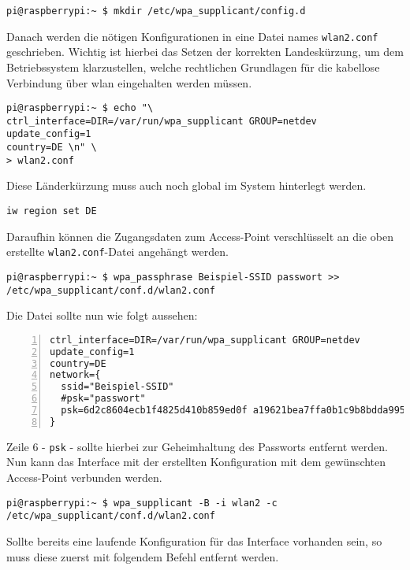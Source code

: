 \begin{lstlisting}
pi@raspberrypi:~ $ mkdir /etc/wpa_supplicant/config.d
\end{lstlisting}

\noindent Danach werden die nötigen Konfigurationen in eine Datei names \texttt{wlan2.conf} geschrieben.
Wichtig ist hierbei das Setzen der korrekten Landeskürzung, um dem Betriebssystem klarzustellen, welche rechtlichen Grundlagen
für die kabellose Verbindung über \gls{wlan} eingehalten werden müssen.

\begin{lstlisting}
pi@raspberrypi:~ $ echo "\
ctrl_interface=DIR=/var/run/wpa_supplicant GROUP=netdev
update_config=1
country=DE \n" \
> wlan2.conf
\end{lstlisting}

\noindent Diese Länderkürzung muss auch noch global im System hinterlegt werden.

\begin{lstlisting}
iw region set DE
\end{lstlisting}

\noindent Daraufhin können die Zugangsdaten zum Access-Point verschlüsselt an die oben erstellte \texttt{wlan2.conf}-Datei angehängt werden.

\begin{lstlisting}
pi@raspberrypi:~ $ wpa_passphrase Beispiel-SSID passwort >> /etc/wpa_supplicant/conf.d/wlan2.conf
\end{lstlisting}

\noindent Die Datei sollte nun wie folgt aussehen:

\begin{lstlisting}[numbers=left,xleftmargin=\dimexpr2.5em-1pt,framexleftmargin=2em]
ctrl_interface=DIR=/var/run/wpa_supplicant GROUP=netdev
update_config=1
country=DE
network={
  ssid="Beispiel-SSID"
  #psk="passwort"
  psk=6d2c8604ecb1f4825d410b859ed0f a19621bea7ffa0b1c9b8bdda995c7135c20
}
\end{lstlisting}

\noindent Zeile \num{6} - \texttt{psk} - sollte hierbei zur Geheimhaltung des Passworts entfernt werden.
Nun kann das Interface mit der erstellten Konfiguration mit dem gewünschten Access-Point verbunden werden.

\begin{lstlisting}
pi@raspberrypi:~ $ wpa_supplicant -B -i wlan2 -c /etc/wpa_supplicant/conf.d/wlan2.conf
\end{lstlisting}

\noindent Sollte bereits eine laufende Konfiguration für das Interface vorhanden sein, so muss diese zuerst mit folgendem
Befehl entfernt werden.

